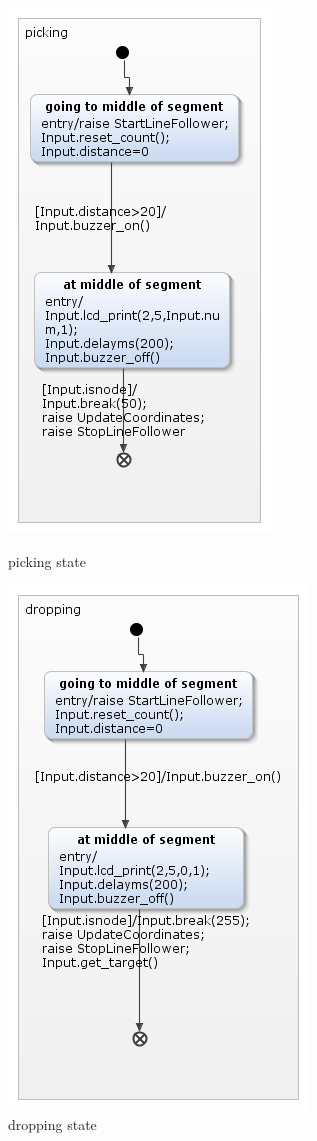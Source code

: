 \documentclass[a4paper,12pt,oneside]{book}
\begin{document}
\begin{itemize}
	\begin{figure}[]
	\begin{minipage}{0.45\textwidth}
	\includegraphics[scale=.6]{picking.png}
\caption{picking state}
\label{picking}
	\end{minipage}
\begin{minipage}{0.45\textwidth}
	\includegraphics[scale=.6]{dropping.png}
\caption{dropping state}
\label{dropping}
\end{minipage}


\end{figure}
\end{itemize}
\end{document}

